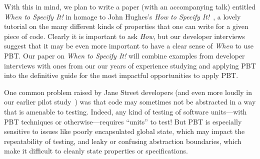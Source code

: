 With this in mind, we plan to write a paper
(with an accompanying talk)
entitled {\em When to Specify It!} in homage to
John Hughes's {\em How to Specify It!}~\cite{HowToSpecifyIt}, a lovely
tutorial on the many different kinds of properties that one can write
for a given piece
of code. Clearly it is important to ask {\em How}, but our developer interviews
suggest that it may be even more important to have a clear sense of {\em When}
to use PBT. Our paper on {\em When to Specify It!} will combine examples from developer
interviews with ones from our our years of experience studying and applying PBT
into the definitive guide for the most impactful opportunities to apply PBT.
\iflater{}
\fi


One common problem raised by Jane Street developers (and even more loudly
in our earlier pilot study~\cite{goldstein2022some}) was
that code may sometimes not be abstracted
in a way that is amenable to testing. Indeed, any kind of
testing of software units---with PBT techniques or otherwise---requires
``units'' to test!  But PBT is
especially sensitive to issues like poorly encapsulated global state, which may
impact the repeatability of testing, and leaky or confusing
abstraction boundaries, which make it difficult to cleanly state
properties or specifications.

